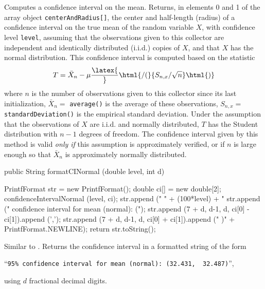 \begin{tabb} Computes a confidence interval on the mean.
  Returns, in elements 0 and 1 of the array
  object \texttt{centerAndRadius[]}, the center and half-length (radius)
  of a confidence interval on the true mean of the random variable $X$,
  with confidence level \texttt{level}, assuming that the observations
  given to this collector are independent and identically distributed
  (i.i.d.) copies of $X$, and that $X$ has the normal distribution.
  This confidence interval is computed based on the statistic
  $$
    T = {\bar X_n - \mu\latex{\over}\html{ / (}{S_{n,x}/\sqrt{n}}\html{)}}
  $$
  where $n$ is the number of observations given to this collector since its
  last initialization, $\bar X_n =$ \texttt{average()} is the average of these
  observations, $S_{n,x} =$ \texttt{standardDeviation()} is the empirical
  standard  deviation.  Under the assumption that the observations
  of $X$ are  i.i.d.{} and normally distributed,
  $T$ has the Student distribution with $n-1$ degrees of freedom.
  The confidence interval given by this method is valid \emph{only if}
  this assumption is approximately verified, or if $n$ is large enough
  so that $\bar X_n$ is approximately normally distributed.
\end{tabb}
\begin{htmlonly}
\end{htmlonly}
\begin{code}

   public String formatCINormal (double level, int d) \begin{hide} {
      PrintfFormat str = new PrintfFormat();
      double ci[] = new double[2];
      confidenceIntervalNormal (level, ci);
      str.append ("  " + (100*level) + "%
      str.append (" confidence interval for mean (normal): (");
      str.append (7 + d, d-1, d, ci[0] - ci[1]).append (',');
      str.append (7 + d, d-1, d, ci[0] + ci[1]).append (" )" + PrintfFormat.NEWLINE);
      return str.toString();
}\end{hide}
\end{code}
\begin{tabb}  Similar to .
   Returns the confidence interval in a formatted string of the form \\
\centerline{``\texttt{95\% confidence interval for mean (normal): (32.431,\, 32.487)}'',}
   using $d$ fractional decimal digits.
\end{tabb}
